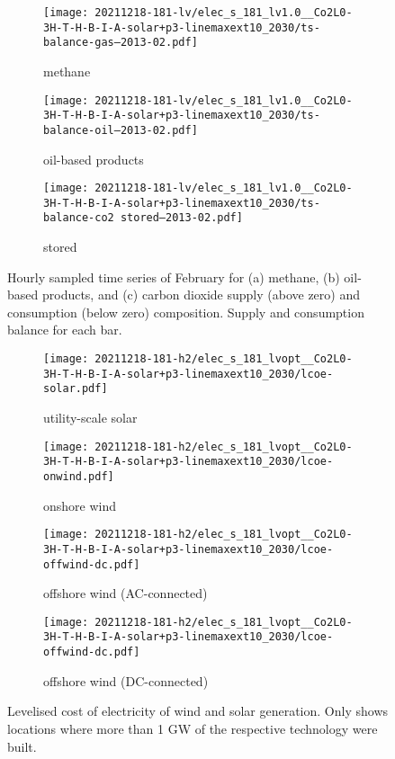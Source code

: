 \begin{figure}
    \centering
    \begin{subfigure}[t]{\textwidth}
        \centering
        \caption{methane}
        \texttt{[image: 20211218-181-lv/elec\_s\_181\_lv1.0\_\_Co2L0-3H-T-H-B-I-A-solar+p3-linemaxext10\_2030/ts-balance-gas--2013-02.pdf]}
    \end{subfigure}
    \begin{subfigure}[t]{\textwidth}
        \centering
        \caption{oil-based products}
        \texttt{[image: 20211218-181-lv/elec\_s\_181\_lv1.0\_\_Co2L0-3H-T-H-B-I-A-solar+p3-linemaxext10\_2030/ts-balance-oil--2013-02.pdf]}
    \end{subfigure}
    \begin{subfigure}[t]{\textwidth}
        \centering
        \caption{stored \co}
        \texttt{[image: 20211218-181-lv/elec\_s\_181\_lv1.0\_\_Co2L0-3H-T-H-B-I-A-solar+p3-linemaxext10\_2030/ts-balance-co2 stored--2013-02.pdf]}
    \end{subfigure}
    \caption{Hourly sampled time series of February for (a) methane, (b) oil-based products, and (c) carbon dioxide supply (above zero) and consumption (below zero) composition. Supply and consumption balance for each bar.}
    \label{fig:output-ts-4}
\end{figure}

\begin{figure}
    \begin{subfigure}{0.49\textwidth}
        \centering
        \caption{utility-scale solar}
        \texttt{[image: 20211218-181-h2/elec\_s\_181\_lvopt\_\_Co2L0-3H-T-H-B-I-A-solar+p3-linemaxext10\_2030/lcoe-solar.pdf]}
    \end{subfigure}
    \begin{subfigure}{0.49\textwidth}
        \centering
        \caption{onshore wind}
        \texttt{[image: 20211218-181-h2/elec\_s\_181\_lvopt\_\_Co2L0-3H-T-H-B-I-A-solar+p3-linemaxext10\_2030/lcoe-onwind.pdf]}
    \end{subfigure}
    \begin{subfigure}{0.49\textwidth}
        \centering
        \caption{offshore wind (AC-connected)}
        \texttt{[image: 20211218-181-h2/elec\_s\_181\_lvopt\_\_Co2L0-3H-T-H-B-I-A-solar+p3-linemaxext10\_2030/lcoe-offwind-dc.pdf]}
    \end{subfigure}
    \begin{subfigure}{0.49\textwidth}
        \centering
        \caption{offshore wind (DC-connected)}
        \texttt{[image: 20211218-181-h2/elec\_s\_181\_lvopt\_\_Co2L0-3H-T-H-B-I-A-solar+p3-linemaxext10\_2030/lcoe-offwind-dc.pdf]}
    \end{subfigure}
    \caption{Levelised cost of electricity of wind and solar generation. Only shows locations where more than 1 GW of the respective technology were built.}
    \label{fig:si:lcoe}
\end{figure}

